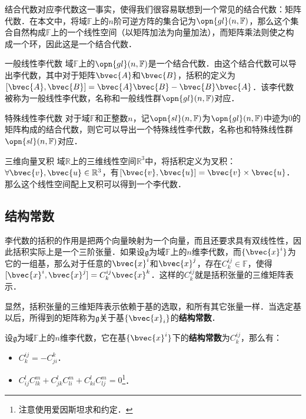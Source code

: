 结合代数对应李代数这一事实，使得我们很容易联想到一个常见的结合代数：矩阵代数．在本文中，将域$\mathbb{F}$上的$n$阶可逆方阵的集合记为$\opn{gl}(n, \mathbb{F})$，那么这个集合自然构成$\mathbb{F}$上的一个线性空间（以矩阵加法为向量加法），而矩阵乘法则使之构成一个环，因此这是一个结合代数．

\begin{example}{一般线性李代数}
域$\mathbb{F}$上的$\opn{gl}(n, \mathbb{F})$是一个结合代数．由这个结合代数可以导出李代数，其中对于矩阵$\bvec{A}$和$\bvec{B}$，括积的定义为$[\bvec{A}, \bvec{B}]=\bvec{A}\bvec{B}-\bvec{B}\bvec{A}$．该李代数被称为一般线性李代数，名称和一般线性群$\opn{gl}(n, \mathbb{F})$对应．
\end{example}

\begin{example}{特殊线性李代数}
对于域$\mathbb{F}$和正整数$n$，记$\opn{sl}(n, \mathbb{F})$为$\opn{gl}(n, \mathbb{F})$中迹为$0$的矩阵构成的结合代数，则它可以导出一个特殊线性李代数，名称也和特殊线性群$\opn{sl}(n, \mathbb{F})$对应．
\end{example}

\begin{example}{三维向量叉积}
域$\mathbb{R}$上的三维线性空间$\mathbb{R}^3$中，将括积定义为叉积：$\forall \bvec{v}, \bvec{u}\in \mathbb{R}^3$，有$[\bvec{v}, \bvec{u}]=\bvec{v}\times\bvec{u}$．那么这个线性空间配上叉积可以得到一个李代数．
\end{example}

\subsection{结构常数}

李代数的括积的作用是把两个向量映射为一个向量，而且还要求具有双线性性，因此括积实际上是一个三阶张量．如果设$\mathfrak{g}$为域$\mathbb{F}$上的$n$维李代数，而$\{\bvec{x}^i\}$为它的一组基，那么对于任意的$\bvec{x}^i$和$\bvec{x}^j$，存在$C_k^{ij}\in\mathbb{F}$，使得$[\bvec{x}^i, \bvec{x}^j]=C_k^{ij}\bvec{x}^k$．这样的$C_k^{ij}$就是括积张量的三维矩阵表示．

显然，括积张量的三维矩阵表示依赖于基的选取，和所有其它张量一样．当选定基以后，所得到的矩阵称为$\mathfrak{g}$关于基$\{\bvec{x}_i\}$的\textbf{结构常数}．

\begin{theorem}{}\label{LieAlg_the1}
设$\mathfrak{g}$为域$\mathbb{F}$上的$n$维李代数，它在基$\{\bvec{x}^i\}$下的\textbf{结构常数}为$C_k^{ij}$，那么有：
\begin{itemize}
\item $C_k^{ij}=-C^k_{ji}$．
\item $C^l_{ij}C^m_{lk}+C^l_{jk}C^m_{li}+C^l_{ki}C^m_{lj}=0$\footnote{注意使用爱因斯坦求和约定．}．
\end{itemize}
\end{theorem}

